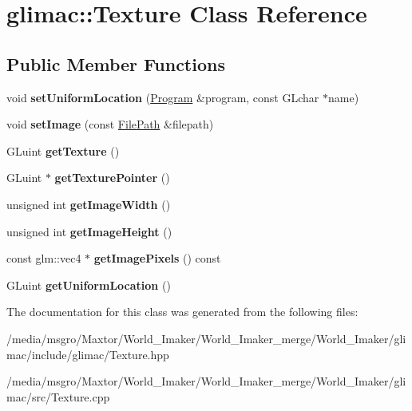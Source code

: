 \hypertarget{classglimac_1_1Texture}{}\section{glimac\+:\+:Texture Class Reference}
\label{classglimac_1_1Texture}
\subsection*{Public Member Functions}
\begin{DoxyCompactItemize}
\item 
\mbox{\label{classglimac_1_1Texture_a2a1e06217a8c98f4ddd7c271b7590c03}} 
void {\bfseries set\+Uniform\+Location} (\hyperlink{classglimac_1_1Program}{Program} \&program, const G\+Lchar $\ast$name)
\item 
\mbox{\label{classglimac_1_1Texture_a412726a887d5b80d6382e0d25584661f}} 
void {\bfseries set\+Image} (const \hyperlink{classglimac_1_1FilePath}{File\+Path} \&filepath)
\item 
\mbox{\label{classglimac_1_1Texture_aab4d5370b02499884260a3ce9e7349be}} 
G\+Luint {\bfseries get\+Texture} ()
\item 
\mbox{\label{classglimac_1_1Texture_ac222b4e2c040a8b64484bb60eb73574f}} 
G\+Luint $\ast$ {\bfseries get\+Texture\+Pointer} ()
\item 
\mbox{\label{classglimac_1_1Texture_af27c9e6a54fe8a60cedaad97d8acbcae}} 
unsigned int {\bfseries get\+Image\+Width} ()
\item 
\mbox{\label{classglimac_1_1Texture_a66760a2dc586c0780ee3b9961048424b}} 
unsigned int {\bfseries get\+Image\+Height} ()
\item 
\mbox{\label{classglimac_1_1Texture_a7060818013d2bfbe42df5d0b01f2825d}} 
const glm\+::vec4 $\ast$ {\bfseries get\+Image\+Pixels} () const
\item 
\mbox{\label{classglimac_1_1Texture_a80d018b2208095d54c3439e6328761ff}} 
G\+Luint {\bfseries get\+Uniform\+Location} ()
\end{DoxyCompactItemize}


The documentation for this class was generated from the following files\+:\begin{DoxyCompactItemize}
\item 
/media/msgro/\+Maxtor/\+World\+\_\+\+Imaker/\+World\+\_\+\+Imaker\+\_\+merge/\+World\+\_\+\+Imaker/glimac/include/glimac/Texture.\+hpp\item 
/media/msgro/\+Maxtor/\+World\+\_\+\+Imaker/\+World\+\_\+\+Imaker\+\_\+merge/\+World\+\_\+\+Imaker/glimac/src/Texture.\+cpp\end{DoxyCompactItemize}
